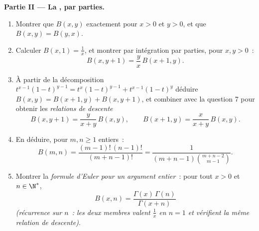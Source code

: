 \begin{problem}
\medskip
\noindent\textbf{Partie II --- La , par parties.}
\begin{enumerate}[resume]
  \item Montrer que $B(x,y)$  exactement pour $x > 0$ et $y >
        0$, et que $B(x,y) = B(y,x)$.
  \item Calculer $B(x, 1) = \frac1x$, et montrer par intégration par
        parties, pour $x, y > 0$~:
        \[
        B(x, y+1) = \frac{y}{x}\,B(x+1, y) .
        \]
  \item À partir de la décomposition $t^{x-1}(1-t)^{y-1} =
        t^{x}(1-t)^{y-1} + t^{x-1}(1-t)^{y}$ déduire $B(x,y) =
        B(x+1,y) + B(x,y+1)$, et combiner avec la question 7 pour obtenir
        les \emph{relations de descente}
        \[
        B(x, y+1) = \frac{y}{x+y}\,B(x,y),
        \qquad
        B(x+1, y) = \frac{x}{x+y}\,B(x,y) .
        \]
  \item En déduire, pour $m, n \geq 1$ entiers~:
        \[
        B(m, n) = \frac{(m-1)!\,(n-1)!}{(m+n-1)!}
        = \frac{1}{(m+n-1)\binom{m+n-2}{m-1}} .
        \]
  \item Montrer la \emph{formule d'Euler pour un argument entier}~:
        pour tout $x > 0$ et $n \in \N^*$,
        \[
        B(x, n) = \frac{\Gamma(x)\,\Gamma(n)}{\Gamma(x + n)}
        \]
        \emph{(récurrence sur $n$~: les deux membres valent $\frac1x$ en $n
        = 1$ et vérifient la même relation de descente)}.
\end{enumerate}


\end{problem}
